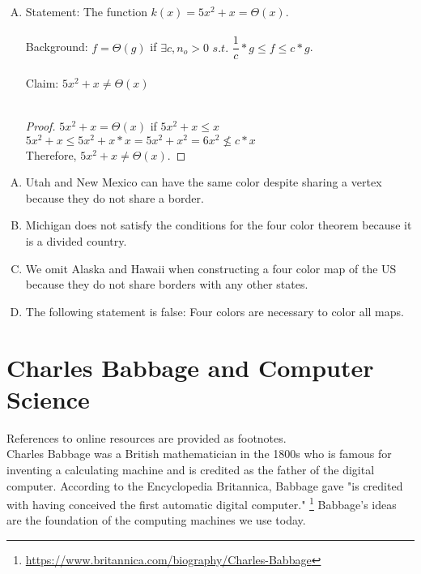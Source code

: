\documentclass{article}
\begin{document}
\begin{enumerate}[(A)]
\begin{proof}
			Therefore, $x^2 + \log(x)=O(x^2)$.
		\end{proof}
	\item Statement: The function $k(x)=5x^2 + x=\Theta (x)$. \\\\
		Background: $f=\Theta (g)$ if $\exists c,n_o >0$ $s.t.$ $\dfrac{1}{c} * g \leq f \leq c*g$. \\\\
		Claim: $5x^2 + x \neq \Theta (x)$ \\\\
		\begin{proof}
			$5x^2 + x = \Theta (x)$ if $5x^2 + x \leq x$ \\
			$5x^2 +x \leq 5x^2 + x*x = 5x^2 + x^2 = 6x^2 \nleq c*x$ \\
			Therefore, $5x^2 + x \neq \Theta (x)$.
		\end{proof}
\end{enumerate}

\clearpage
\header

\begin{enumerate}[(A)]
	\item Utah and New Mexico can have the same color despite sharing a vertex because they do not share a border.
	\item Michigan does not satisfy the conditions for the four color theorem because it is a divided country.
	\item We omit Alaska and Hawaii when constructing a four color map of the US because they do not share borders with any other states.
	\item The following statement is false: Four colors are necessary to color all maps.
\end{enumerate}

\clearpage
\header

\section*{Charles Babbage and Computer Science}

References to online resources are provided as footnotes. \\

Charles Babbage was a British mathematician in the 1800s who is famous for inventing a calculating machine and is credited as the father of the digital computer. According to the Encyclopedia Britannica, Babbage gave "is credited with having conceived the first automatic digital computer."
\footnote{\url{https://www.britannica.com/biography/Charles-Babbage}}
Babbage's ideas are the foundation of the computing machines we use today.
\end{document}
